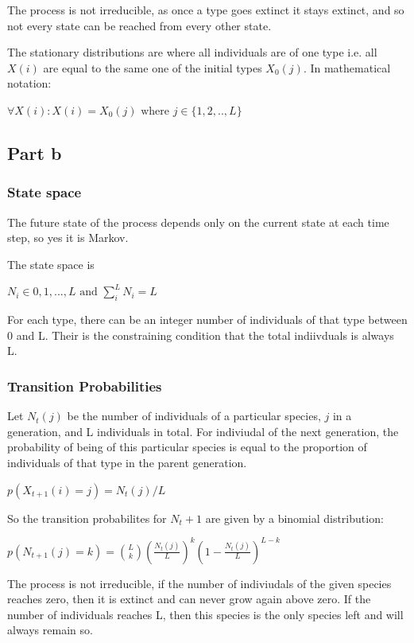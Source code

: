 \documentclass{article}
\begin{document}
The process is not irreducible, as once a type goes extinct it stays extinct, and so not every state can be reached from every other state.

The stationary distributions are where all individuals are of one type i.e. all $X(i)$ are equal to the same one of the initial types $X_0(j)$. In mathematical notation:

$ \forall X(i) : X(i) = X_0(j) \text{ where } j \in \{1,2,..,L\}$  

\subsection{Part b}

\subsubsection{State space}

The future state of the process depends only on the current state at each time step, so yes it is Markov. 

The state space is 

$N_i \in {0,1,...,L} \text{ and } \sum\limits_i^LN_i = L$ 

For each type, there can be an integer number of individuals of that type between 0 and L. Their is the constraining condition that the total indiivduals is always L. 

\subsubsection{Transition Probabilities}

Let $N_t(j)$ be the number of individuals of a particular species, $j$ in a generation, and L individuals in total. For indiviudal of the next generation, the probability of being of this particular species is equal to the proportion of individuals of that type in the parent generation. 

$p(X_{t+1}(i) = j) = N_t(j)/L$

So the transition probabilites for $N_t+1$ are given by a binomial distribution:

$p(N_{t+1}(j) = k) = {L \choose k}(\frac{N_t(j)}{L})^k(1-\frac{N_t(j)}{L})^{L-k}$

The process is not irreducible, if the number of indiviudals of the given species reaches zero, then it is extinct and can never grow again above zero. If the number of individuals reaches L, then this species is the only species left and will always remain so. 
\end{document}
